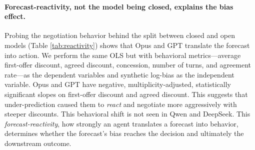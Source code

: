 \documentclass{article}
\begin{document}
\paragraph{Forecast-reactivity, not the model being closed, explains the bias effect.} Probing the negotiation behavior behind the split between closed and open models (Table \ref{tab:reactivity}) shows that Opus and GPT translate the forecast into action. We perform the same OLS but with behavioral metrics---average first-offer discount, agreed discount, concession, number of turns, and agreement rate---as the dependent variables and synthetic log-bias as the independent variable. Opus and GPT have negative, multiplicity-adjusted, statistically significant slopes on first-offer discount and agreed discount. This suggests that under-prediction caused them to \emph{react} and negotiate more aggressively with steeper discounts. This behavioral shift is not seen in Qwen and DeepSeek. This \emph{forecast-reactivity}, how strongly an agent translates a forecast into behavior, determines whether the forecast's bias reaches the decision and ultimately the downstream outcome.
\end{document}
